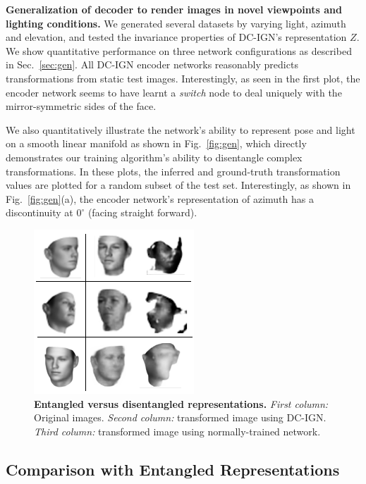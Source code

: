 \documentclass[12pt,twoside]{mitthesis}
\begin{document}
\textbf{Generalization of decoder to render images in novel viewpoints
and lighting conditions.} We generated several datasets by varying
light, azimuth and elevation, and tested the invariance properties of
DC-IGN's representation \(Z\). We show quantitative performance on three
network configurations as described in Sec.~\ref{sec:gen}. All DC-IGN
encoder networks reasonably predicts transformations from static test
images. Interestingly, as seen in the first plot, the encoder network
seems to have learnt a \emph{switch} node to deal uniquely with the
mirror-symmetric sides of the face.

We also quantitatively illustrate the network's ability to represent
pose and light on a smooth linear manifold as shown in
Fig.~\ref{fig:gen}, which directly demonstrates our training algorithm's
ability to disentangle complex transformations. In these plots, the
inferred and ground-truth transformation values are plotted for a random
subset of the test set. Interestingly, as shown in
Fig.~\ref{fig:gen}(a), the encoder network's representation of azimuth
has a discontinuity at \(0^\circ\) (facing straight forward).

\begin{figure}[htbp]
\centering
\includegraphics{../figures/entangled-disentangled-comparison.png}
\caption{\label{fig:pose_and_entangledcomparison}\textbf{Entangled
versus disentangled representations.} \emph{First column:} Original
images. \emph{Second column:} transformed image using DC-IGN.
\emph{Third column:} transformed image using normally-trained network.}
\end{figure}

\subsection{Comparison with Entangled
Representations}\label{comparison-with-entangled-representations}
\end{document}
